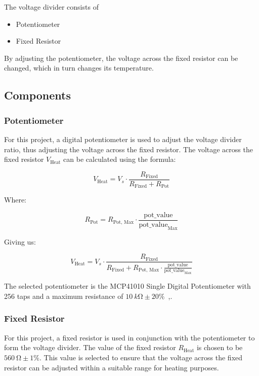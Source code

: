 \documentclass[12pt,a4paper]{article}
\begin{document}
The voltage divider consists of 
\begin{itemize}
    \item Potentiometer
    \item Fixed Resistor
\end{itemize} 
By adjusting the potentiometer, the voltage across the fixed resistor can be changed, which in turn changes its temperature.

\subsection{Components}
\subsubsection{Potentiometer}
For this project, a digital potentiometer is used to adjust the voltage divider ratio, thus adjusting the voltage across the fixed resistor. The voltage across the fixed resistor $V_{\text{Heat}}$ can be calculated using the formula:

\begin{equation*}
    V_{\text{Heat}} = V_s \cdot \frac{R_{\text{Fixed}}}{R_{\text{Fixed}} + R_{\text{Pot}}}
\end{equation*}

Where:

\begin{equation*}
    R_{\text{Pot}} = R_{\text{Pot, Max}} \cdot \frac{\text{pot\_value}}{\text{pot\_value}_{\text{Max}}}
\end{equation*}

Giving us:

\begin{equation}
    \label{eq:v-heat-theta}
    V_{\text{Heat}} = V_s \cdot \frac{R_{\text{Fixed}}}{R_{\text{Fixed}} + R_{\text{Pot, Max}} \cdot \frac{\text{pot\_value}}{\text{pot\_value}_{\text{Max}}}}
\end{equation}

The selected potentiometer is the MCP41010 Single Digital Potentiometer with 256 taps and a maximum resistance of $\SI{10}{k\ohm}\pm 20\%$~\cite{potentiometer},\cite{pot-tolerance}.

\subsubsection{Fixed Resistor}
For this project, a fixed resistor is used in conjunction with the potentiometer to form the voltage divider. The value of the fixed resistor $R_{\text{Heat}}$ is chosen to be $\SI{560}{\ohm}\pm 1\%$. This value is selected to ensure that the voltage across the fixed resistor can be adjusted within a suitable range for heating purposes.
\end{document}
